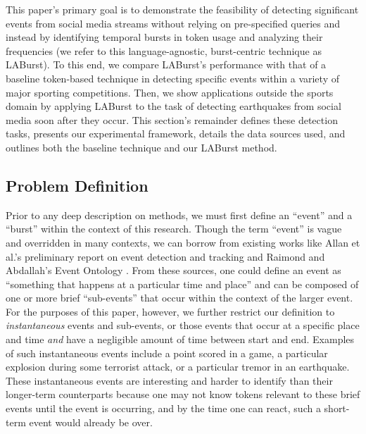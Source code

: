\documentclass{acm_proc_article-sp}
\begin{document}
This paper's primary goal is to demonstrate the feasibility of detecting significant events from social media streams without relying on pre-specified queries and instead by identifying temporal bursts in token usage and analyzing their frequencies (we refer to this language-agnostic, burst-centric technique as LABurst).
To this end, we compare LABurst's performance with that of a baseline token-based technique in detecting specific events within a variety of major sporting competitions.
Then, we show applications outside the sports domain by applying LABurst to the task of detecting earthquakes from social media soon after they occur.
This section's remainder defines these detection tasks, presents our experimental framework, details the data sources used, and outlines both the baseline technique and our LABurst method.

\subsection{Problem Definition}

Prior to any deep description on methods, we must first define an ``event'' and a ``burst'' within the context of this research.
Though the term ``event'' is vague and overridden in many contexts, we can borrow from existing works like Allan et al.'s preliminary report on event detection and tracking and Raimond and Abdallah's Event Ontology \cite{Raimond2007,allan1998line}.
From these sources, one could define an event as ``something that happens at a particular time and place'' and can be composed of one or more brief ``sub-events'' that occur within the context of the larger event.
For the purposes of this paper, however, we further restrict our definition to \emph{instantaneous} events and sub-events, or those events that occur at a specific place and time \emph{and} have a negligible amount of time between start and end.
Examples of such instantaneous events include a point scored in a game, a particular explosion during some terrorist attack, or a particular tremor in an earthquake.
These instantaneous events are interesting and harder to identify than their longer-term counterparts because one may not know tokens relevant to these brief events until the event is occurring, and by the time one can react, such a short-term event would already be over. 
\end{document}
